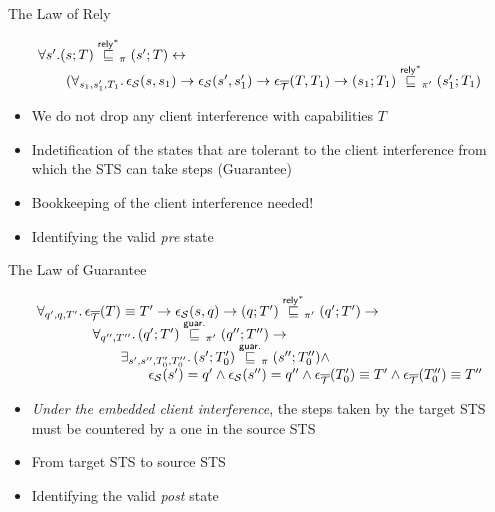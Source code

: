 \documentclass[aspectratio=169,xcolor=dvipsnames]{beamer}
\begin{document}
\begin{frame}{The Law of Rely}\scriptsize
 \begin{theorem}\scriptsize
            \[
            \begin{array}{l}\forall s' .   (s;T) \overset{\mathsf{rely}^{*}}{\sqsubseteq}_{\pi}  (s';T) \leftrightarrow \\
           \quad\quad  (\forall_{s_1,s_1',T_1} \ldotp \epsilon_{\mathcal{S}}(s ,s_1) \rightarrow \epsilon_{\mathcal{S}}(s',s'_1) \rightarrow \epsilon_{\overline{\mathcal{T}}}(T,T_1) \rightarrow ( s_1; T_1) \overset{\mathsf{rely}^{*}}{\sqsubseteq}_{\pi'} (s'_1; T_1)
            \end{array}
           \]
     \end{theorem}
     \begin{itemize}
         \item We do not drop any client interference with capabilities $T$
         \item Indetification of the states that are tolerant to the client interference from which the STS can take steps (Guarantee)
         \item Bookkeeping of the client interference needed!  
         \item Identifying the valid \emph{pre} state
     \end{itemize}
\end{frame}
\begin{frame}{The Law of Guarantee}\scriptsize
    \begin{theorem} 
\[
\begin{array}{l}
\forall_{q',q, T'} \ldotp 
    \epsilon_{\overline{\mathcal{T}}} ( T) \equiv T' \rightarrow \epsilon_{\mathcal{S}}(s,q)
\rightarrow   (q;T')\overset{\mathsf{rely}^{*}}{\sqsubseteq}_{\pi'}(q';T') \rightarrow  \\
\quad\quad\quad\quad \forall_{q'',T''}\ldotp (q';T')\overset{\mathsf{guar.}}{\sqsubseteq}_{\pi'}(q'';T'') \rightarrow  \\
\quad\quad\quad\quad\quad\quad \exists_{s',s'',T'_0,T''_0} \ldotp (s';T'_0) \overset{\mathsf{guar.}}{\sqsubseteq}_{\pi} (s'';T''_0) \land \\ \quad\quad\quad\quad\quad\quad\quad\quad \epsilon_{\mathcal{S}}(s')=q' \land \epsilon_{\mathcal{S}}(s'') = q'' \land \epsilon_{\overline{\mathcal{T}}}(T'_0) \equiv T' \land \epsilon_{\overline{\mathcal{T}}}(T''_0) \equiv T''
 \end{array}
\]
\end{theorem}
\begin{itemize}
    \item \emph{Under the embedded client interference}, the steps taken by the target STS must be countered by a one in the source STS
    \item From target STS to source STS
    \item Identifying the valid \emph{post} state 
\end{itemize}
\end{frame}
\end{document}
